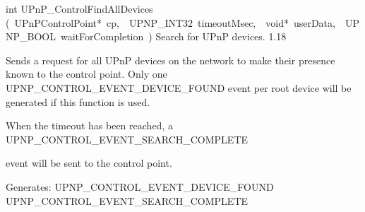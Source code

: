 \documentclass{article}
\begin{document}
\begin{cxxentry}
\begin{cxxfunction}
\begin{cxxdoc}
\end{cxxdoc}
\end{cxxfunction}
\begin{cxxfunction}
{int}
        {UPnP\_ControlFindAllDevices}
        {(\ UPnPControlPoint*\ cp,\ \ UPNP\_INT32\ timeoutMsec,\ \ void*\ userData,\ \ UPNP\_BOOL\ waitForCompletion\ )}
        {Search for UPnP devices. }
        {1.18}
\begin{cxxdoc}

Sends a request for all UPnP devices on the network to make their
presence known to the control point.  Only one
UPNP\_CONTROL\_EVENT\_DEVICE\_FOUND event per root device will be generated
if this function is used.

When the timeout has been reached, a UPNP\_CONTROL\_EVENT\_SEARCH\_COMPLETE

event will be sent to the control point.

Generates:
UPNP\_CONTROL\_EVENT\_DEVICE\_FOUND
UPNP\_CONTROL\_EVENT\_SEARCH\_COMPLETE



\end{cxxdoc}
\end{cxxfunction}
\end{cxxentry}
\end{document}
